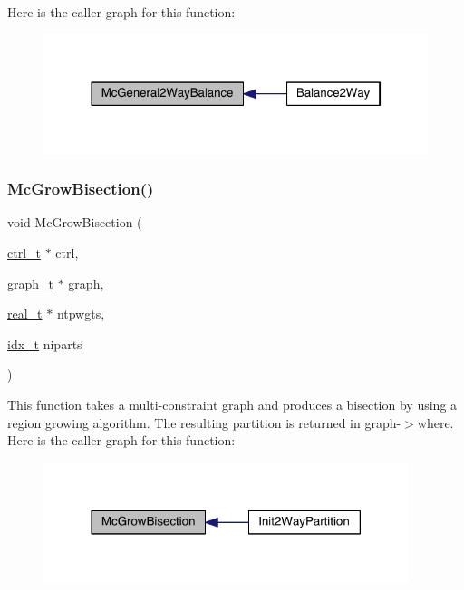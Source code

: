 Here is the caller graph for this function\+:\nopagebreak
\begin{figure}[H]
\begin{center}
\leavevmode
\includegraphics[width=322pt]{a00945_a765ccbdaa41401e55a2b6d350964f289_icgraph}
\end{center}
\end{figure}
\mbox{\label{a00945_af361dc8ba850849b9230c5c7c8c8c582}} 
\subsubsection{\texorpdfstring{Mc\+Grow\+Bisection()}{McGrowBisection()}}
{\footnotesize\ttfamily void Mc\+Grow\+Bisection (\begin{DoxyParamCaption}\item[{\hyperlink{a00742}{ctrl\+\_\+t} $\ast$}]{ctrl,  }\item[{\hyperlink{a00734}{graph\+\_\+t} $\ast$}]{graph,  }\item[{\hyperlink{a00876_a1924a4f6907cc3833213aba1f07fcbe9}{real\+\_\+t} $\ast$}]{ntpwgts,  }\item[{\hyperlink{a00876_aaa5262be3e700770163401acb0150f52}{idx\+\_\+t}}]{niparts }\end{DoxyParamCaption})}

This function takes a multi-\/constraint graph and produces a bisection by using a region growing algorithm. The resulting partition is returned in graph-\/$>$where. Here is the caller graph for this function\+:\nopagebreak
\begin{figure}[H]
\begin{center}
\leavevmode
\includegraphics[width=302pt]{a00945_af361dc8ba850849b9230c5c7c8c8c582_icgraph}
\end{center}
\end{figure}
\mbox{\label{a00945_a3ac013a2933e687d40aee2496120367e}} 
